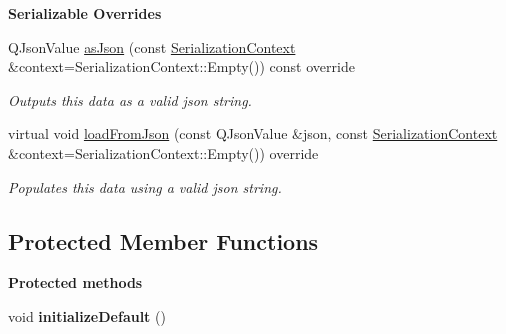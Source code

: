 \begin{Indent}\textbf{ Serializable Overrides}\par
\begin{DoxyCompactItemize}
\item 
\mbox{\label{classrev_1_1_rigid_body_component_a5032f006f786a02a22427d35cc540ed3}} 
Q\+Json\+Value \mbox{\hyperlink{classrev_1_1_rigid_body_component_a5032f006f786a02a22427d35cc540ed3}{as\+Json}} (const \mbox{\hyperlink{structrev_1_1_serialization_context}{Serialization\+Context}} \&context=Serialization\+Context\+::\+Empty()) const override
\begin{DoxyCompactList}\small\item\em Outputs this data as a valid json string. \end{DoxyCompactList}\item 
\mbox{\label{classrev_1_1_rigid_body_component_a703615c4b6cc3916945ff598d81c95b5}} 
virtual void \mbox{\hyperlink{classrev_1_1_rigid_body_component_a703615c4b6cc3916945ff598d81c95b5}{load\+From\+Json}} (const Q\+Json\+Value \&json, const \mbox{\hyperlink{structrev_1_1_serialization_context}{Serialization\+Context}} \&context=Serialization\+Context\+::\+Empty()) override
\begin{DoxyCompactList}\small\item\em Populates this data using a valid json string. \end{DoxyCompactList}\end{DoxyCompactItemize}
\end{Indent}
\subsection*{Protected Member Functions}
\begin{Indent}\textbf{ Protected methods}\par
\begin{DoxyCompactItemize}
\item 
\mbox{\label{classrev_1_1_rigid_body_component_ac921010fa3d64fc0161ba9262b220723}} 
void {\bfseries initialize\+Default} ()
\end{DoxyCompactItemize}
\end{Indent}
